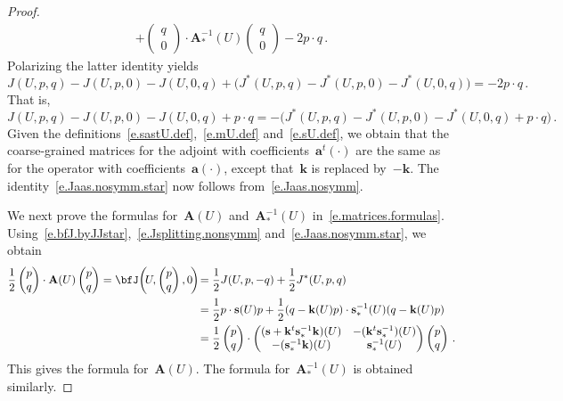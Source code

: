 \documentclass[11pt,twoside]{article} %
\numberwithin{equation}{section}
\theoremstyle{definition}
\newcommand{\s}{\mathbf{s}}
\renewcommand{\a}{\mathbf{a}}
\renewcommand{\k}{\mathbf{k}}
\newcommand{\bfA}{\mathbf{A}}
\begin{document}
\begin{proof}
\begin{align*}
+ 
\begin{pmatrix} q  \\ 0 \end{pmatrix} \cdot \bfA_*^{-1}(U) \begin{pmatrix} q  \\ 0 \end{pmatrix}
-2p\cdot q
\,.
\end{align*}
Polarizing the latter identity yields 
\begin{equation*}
J(U,p,q) - J(U,p,0) - J(U,0,q) 
+
\bigl( J^*(U,p,q) - J^*(U,p,0) - J^*(U,0,q) \bigr) 
=
-2 p\cdot q
\,.
\end{equation*}
That is, 
\begin{equation*}
J(U,p,q) - J(U,p,0) - J(U,0,q) 
+ p\cdot q 
=
- \bigl( J^*(U,p,q) - J^*(U,p,0) - J^*(U,0,q)
+ p\cdot q
\bigr)
\,.
\end{equation*}
Given the definitions~\eqref{e.sastU.def},~\eqref{e.mU.def} and~\eqref{e.sU.def}, we obtain that the coarse-grained matrices for the adjoint with coefficients~$\a^t(\cdot)$ are the same as for the operator with coefficients~$\a(\cdot)$, except that~$\k$ is replaced by~$-\k$. The identity~\eqref{e.Jaas.nosymm.star} now follows from~\eqref{e.Jaas.nosymm}.

\smallskip

We next prove the formulas for~$\bfA(U)$ and~$\bfA_*^{-1}(U)$ in~\eqref{e.matrices.formulas}. 
Using~\eqref{e.bfJ.byJJstar},~\eqref{e.Jsplitting.nonsymm} and~\eqref{e.Jaas.nosymm.star}, we obtain 
\begin{align*}
\frac12 
\begin{pmatrix} p   \\ q\end{pmatrix}\cdot \bfA(U) \begin{pmatrix} p   \\ q\end{pmatrix}
= \bfJ\biggl( \! U, \begin{pmatrix} p   \\ q\end{pmatrix}, 0 \!\biggr) \!
& 
=
\frac12 J(U,p,-q) + \frac12 J^*(U,p,q) 
\\ & 
=
\frac12 p\cdot \s(U) p + \frac12 (q-\k(U)p) \cdot \s_*^{-1}(U)  (q-\k(U)p)
\\ & 
=
\frac12 \begin{pmatrix} p   \\ q\end{pmatrix}\cdot
\begin{pmatrix} (\s + \k^t\s_*^{-1}\k)(U) & -(\k^t\s_*^{-1})(U) \\ -(\s_*^{-1}\k)(U) & \s_*^{-1}(U) \end{pmatrix}
\begin{pmatrix} p  \\q\end{pmatrix}\,.
\end{align*}
This gives the formula for~$\bfA(U)$. The formula for~$\bfA_*^{-1}(U)$ is obtained similarly.


\end{proof}
\end{document}

